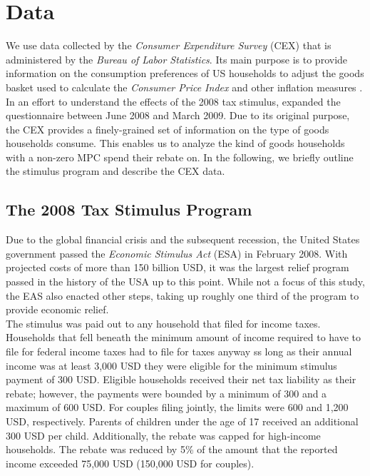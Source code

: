 \section{Data} \label{sec:data}
We use data collected by the \textit{Consumer Expenditure Survey} (CEX) that is administered by the \textit{Bureau of Labor Statistics}. Its main purpose is to provide information on the consumption preferences of US households to adjust the goods basket used to calculate the \textit{Consumer Price Index} and other inflation measures \citep{CEX}. In an effort to understand the effects of the 2008 tax stimulus, \cite{parkeretal_2013} expanded the questionnaire between June 2008 and March 2009.  Due to its original purpose, the CEX provides a finely-grained set of information on the type of goods households consume. This enables us to analyze the kind of goods households with a non-zero MPC spend their rebate on. In the following, we briefly outline the stimulus program and describe the CEX data. 

\subsection{The 2008 Tax Stimulus Program}  \label{subsec:stimulus_desc}
Due to the global financial crisis and the subsequent recession, the United States government passed the \textit{Economic Stimulus Act} (ESA) in February 2008. With projected costs of more than 150 billion USD, it was the largest relief program passed in the history of the USA up to this point. While not a focus of this study, the EAS also enacted other steps, taking up roughly one third of the program to provide economic relief. \\
The stimulus was paid out to any household that filed for income taxes. Households that fell beneath the minimum amount of income required to have to file for federal income taxes had to file for taxes anyway ss long as their annual income was at least 3,000 USD they were eligible for the minimum stimulus payment of 300 USD. Eligible households received their net tax liability as their rebate; however, the payments were bounded by a minimum of 300 and a maximum of 600 USD. For couples filing jointly, the limits were 600 and 1,200 USD, respectively. Parents of children under the age of 17 received an additional 300 USD per child. Additionally, the rebate was capped for high-income households. The rebate was reduced by 5\% of the amount that the reported income exceeded 75,000 USD (150,000 USD for couples).


